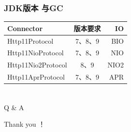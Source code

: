 \documentclass{beamer}
\begin{document}
\begin{frame}[allowframebreaks]
\frametitle{JDK版本 与GC}
\centering
\begin{tabular}{|l|c|r|}
	\hline 
	\large	Connector&  \large 版本要求&  \large IO \\
	\hline 
	Http11Protocol & 7、8、9 & BIO \\
	\hline 
	Http11NioProtocol & 7、8、9 & NIO \\
	\hline 
	Http11Nio2Protocol & 8、9& NIO2  \\
	\hline 
	Http11AprProtocol& 7、8、9 & APR \\
	\hline
\end{tabular}
\end{frame}

\section*{}



\begin{frame}
    \centering
   \Huge Q \& A
\end{frame}

\begin{frame}
\centering
\Huge Thank you ！
\end{frame}
\end{document}
